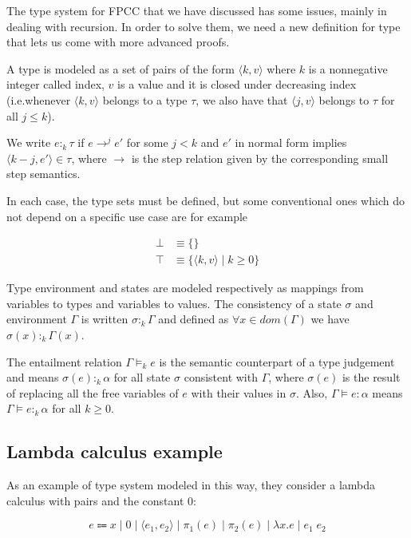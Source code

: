 \documentclass{article}
\begin{document}
The type system for FPCC that we have discussed has 
some issues, mainly in dealing with recursion. 
In order to solve them, we need a new definition for
type that lets us come with more advanced proofs.

A type is modeled as a set of pairs of the form 
$\langle k, v \rangle$ where $k$ is a nonnegative integer called 
index, $v$ is a value and it is closed under decreasing index 
(i.e.whenever $\langle k, v \rangle$ belongs to a type $\tau$, 
we also have that $\langle j, v \rangle$ belongs to 
$\tau$ for all $j \leq k$).

We write $e :_k \tau$ if $e \rightarrow^j e'$ for some $j < k$ 
and $e'$ in normal form implies 
$\langle k - j, e'\rangle \in \tau$, where $\rightarrow$ 
is the step relation given by the corresponding small step 
semantics.

In each case, the type sets must be defined, but some conventional 
ones which do not depend on a specific use case are for example 

\begin{align*}
  \bot &\equiv \{\} \\ 
  \top &\equiv \{ \langle k, v \rangle\;|\; k \geq 0 \}
\end{align*}

Type environment and states are modeled respectively as mappings 
from variables to types and variables to values. The consistency 
of a state $\sigma$ and environment $\Gamma$ is written 
$\sigma :_k \Gamma$ and defined as $\forall x \in dom(\Gamma)$
we have $\sigma(x) :_k \Gamma(x)$.

The entailment relation $\Gamma \models_k e$ is the semantic 
counterpart of a type judgement and means 
$\sigma(e):_k \alpha$ for all state $\sigma$ consistent with 
$\Gamma$, where $\sigma(e)$ is the result of replacing all the 
free variables of $e$ with their values in $\sigma$. Also, 
$\Gamma \models e : \alpha$ means 
$\Gamma \models e :_k \alpha$ for all $k \geq 0$.

\subsection*{Lambda calculus example}

As an example of type system modeled in this way, they consider 
a lambda calculus with pairs and the constant $0$:

$$
  e \Coloneqq x 
      \;|\; 0 
      \;|\; \langle e_1, e_2 \rangle 
      \;|\; \pi_1(e) 
      \;|\; \pi_2(e)
      \;|\; \lambda x. e 
      \;|\; e_1\;e_2
$$
\end{document}
